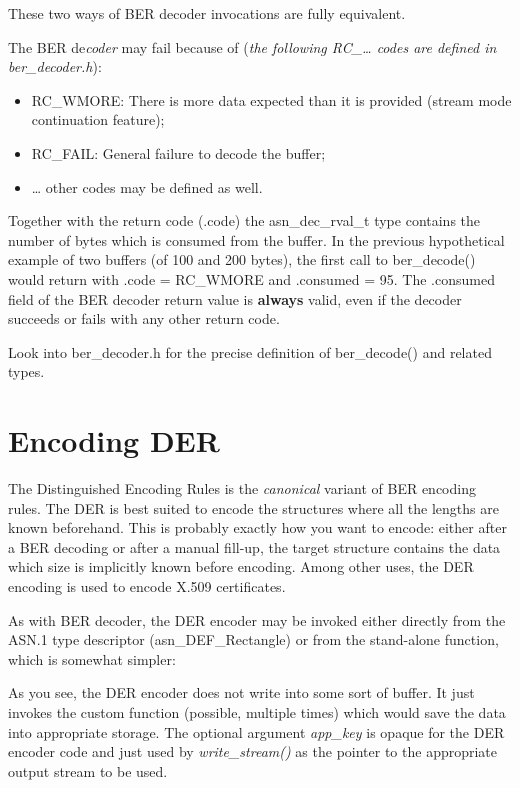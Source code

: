 \documentclass[english,oneside,12pt]{book}
\begin{document}
These two ways of BER decoder invocations are fully equivalent.

The BER de\emph{coder} may fail because of (\emph{the following RC\_\ldots{}
codes are defined in ber\_decoder.h}):
\begin{itemize}
\item RC\_WMORE: There is more data expected than it is provided (stream
mode continuation feature);
\item RC\_FAIL: General failure to decode the buffer;
\item \ldots{} other codes may be defined as well.
\end{itemize}
Together with the return code (.code) the asn\_dec\_rval\_t type contains
the number of bytes which is consumed from the buffer. In the previous
hypothetical example of two buffers (of 100 and 200 bytes), the first
call to ber\_decode() would return with .code = RC\_WMORE and .consumed
= 95. The .consumed field of the BER decoder return value is \textbf{always}
valid, even if the decoder succeeds or fails with any other return
code.

Look into ber\_decoder.h for the precise definition of ber\_decode()
and related types.


\section{\label{sec:Encoding-DER}Encoding DER}

The Distinguished Encoding Rules is the \emph{canonical} variant of
BER encoding rules. The DER is best suited to encode the structures
where all the lengths are known beforehand. This is probably exactly
how you want to encode: either after a BER decoding or after a manual
fill-up, the target structure contains the data which size is implicitly
known before encoding. Among other uses, the DER encoding is used
to encode X.509 certificates.

As with BER decoder, the DER encoder may be invoked either directly
from the ASN.1 type descriptor (asn\_DEF\_Rectangle) or from the stand-alone
function, which is somewhat simpler:
As you see, the DER encoder does not write into some sort of buffer.
It just invokes the custom function (possible, multiple
times) which would save the data into appropriate storage. The optional
argument \emph{app\_key} is opaque for the DER encoder code and just
used by \emph{write\_stream()} as the pointer to the appropriate
output stream to be used.
\end{document}
